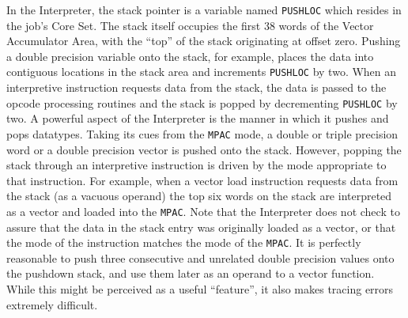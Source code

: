\documentclass[refcap, oxford]{ahsan}
\begin{document}
In the Interpreter, the stack pointer is a variable named \texttt{PUSHLOC} which resides in the job's Core Set. The stack itself occupies the first 38 words of the Vector Accumulator Area, with the ``top'' of the stack originating at offset zero. Pushing a double precision variable onto the stack, for example, places the data into contiguous locations in the stack area and increments \texttt{PUSHLOC} by two. When an interpretive instruction requests data from the stack, the data is passed to the opcode processing routines and the stack is popped by decrementing \texttt{PUSHLOC} by two. A powerful aspect of the Interpreter is the manner in which it pushes and pops datatypes. Taking its cues from the \texttt{MPAC} mode, a double or triple precision word or a double precision vector is pushed onto the stack. However, popping the stack through an interpretive instruction is driven by the mode appropriate to that instruction. For example, when a vector load instruction requests data from the stack (as a vacuous operand) the top six words on the stack are interpreted as a vector and loaded into the \texttt{MPAC}. Note that the Interpreter does not check to assure that the data in the stack entry was originally loaded as a vector, or that the mode of the instruction matches the mode of the \texttt{MPAC}. It is perfectly reasonable to push three consecutive and unrelated double precision values onto the pushdown stack, and use them later as an operand to a vector function. While this might be perceived as a useful ``feature'', it also makes tracing errors extremely difficult.
\end{document}
